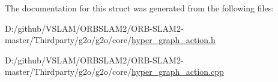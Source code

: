 The documentation for this struct was generated from the following files\+:\begin{DoxyCompactItemize}
\item 
D\+:/github/\+V\+S\+L\+A\+M/\+O\+R\+B\+S\+L\+A\+M2/\+O\+R\+B-\/\+S\+L\+A\+M2-\/master/\+Thirdparty/g2o/g2o/core/\mbox{\hyperlink{hyper__graph__action_8h}{hyper\+\_\+graph\+\_\+action.\+h}}\item 
D\+:/github/\+V\+S\+L\+A\+M/\+O\+R\+B\+S\+L\+A\+M2/\+O\+R\+B-\/\+S\+L\+A\+M2-\/master/\+Thirdparty/g2o/g2o/core/\mbox{\hyperlink{hyper__graph__action_8cpp}{hyper\+\_\+graph\+\_\+action.\+cpp}}\end{DoxyCompactItemize}

